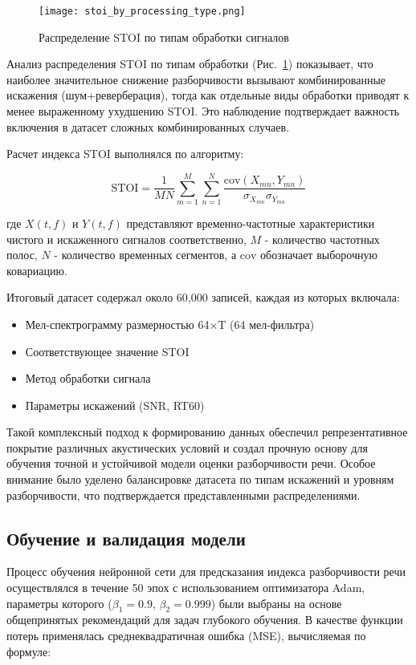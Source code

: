 \documentclass[oneside, final, 14pt]{extarticle}
\begin{document}
\begin{figure}[]
	\centering
	\texttt{[image: stoi\_by\_processing\_type.png]}
	\caption{Распределение STOI по типам обработки сигналов}
	\label{fig:stoi_by_type}
\end{figure}

Анализ распределения STOI по типам обработки (Рис.~\ref{fig:stoi_by_type}) показывает, что наиболее значительное снижение разборчивости вызывают комбинированные искажения (шум+реверберация), тогда как отдельные виды обработки приводят к менее выраженному ухудшению STOI. Это наблюдение подтверждает важность включения в датасет сложных комбинированных случаев.

Расчет индекса STOI выполнялся по алгоритму:

\begin{equation}
	\text{STOI} = \frac{1}{MN}\sum_{m=1}^{M}\sum_{n=1}^{N}\frac{\text{cov}(X_{mn},Y_{mn})}{\sigma_{X_{mn}}\sigma_{Y_{mn}}}
\end{equation}

где $X(t,f)$ и $Y(t,f)$ представляют временно-частотные характеристики чистого и искаженного сигналов соответственно, $M$ - количество частотных полос, $N$ - количество временных сегментов, а $\text{cov}$ обозначает выборочную ковариацию.

Итоговый датасет содержал около 60,000 записей, каждая из которых включала:
\begin{itemize}
	\setlength{\itemsep}{0pt}
	\item Мел-спектрограмму размерностью 64×T (64 мел-фильтра)
	\item Соответствующее значение STOI
	\item Метод обработки сигнала
	\item Параметры искажений (SNR, RT60)
\end{itemize}


Такой комплексный подход к формированию данных обеспечил репрезентативное покрытие различных акустических условий и создал прочную основу для обучения точной и устойчивой модели оценки разборчивости речи. Особое внимание было уделено балансировке датасета по типам искажений и уровням разборчивости, что подтверждается представленными распределениями.

\subsection{Обучение и валидация модели}

Процесс обучения нейронной сети для предсказания индекса разборчивости речи осуществлялся в течение 50 эпох с использованием оптимизатора Adam, параметры которого ($\beta_1=0.9$, $\beta_2=0.999$) были выбраны на основе общепринятых рекомендаций для задач глубокого обучения. В качестве функции потерь применялась среднеквадратичная ошибка (MSE), вычисляемая по формуле:
\end{document}
